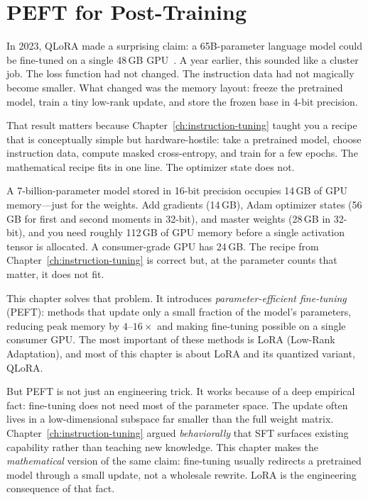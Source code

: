 \chapter{PEFT for Post-Training}
\label{ch:peft}
\raggedbottom

In 2023, QLoRA made a surprising claim: a 65B-parameter language model could be fine-tuned on a single 48\,GB GPU~\cite{dettmers2023qlora}. A year earlier, this sounded like a cluster job. The loss function had not changed. The instruction data had not magically become smaller. What changed was the memory layout: freeze the pretrained model, train a tiny low-rank update, and store the frozen base in 4-bit precision.

That result matters because Chapter~\ref{ch:instruction-tuning} taught you a recipe that is conceptually simple but hardware-hostile: take a pretrained model, choose instruction data, compute masked cross-entropy, and train for a few epochs. The mathematical recipe fits in one line. The optimizer state does not.

A 7-billion-parameter model stored in 16-bit precision occupies 14\,GB of GPU memory---just for the weights. Add gradients (14\,GB), Adam optimizer states (56\,GB for first and second moments in 32-bit), and master weights (28\,GB in 32-bit), and you need roughly 112\,GB of GPU memory before a single activation tensor is allocated. A consumer-grade GPU has 24\,GB. The recipe from Chapter~\ref{ch:instruction-tuning} is correct but, at the parameter counts that matter, it does not fit.

This chapter solves that problem. It introduces \emph{parameter-efficient fine-tuning} (PEFT): methods that update only a small fraction of the model's parameters, reducing peak memory by $4$--$16\times$ and making fine-tuning possible on a single consumer GPU. The most important of these methods is LoRA (Low-Rank Adaptation), and most of this chapter is about LoRA and its quantized variant, QLoRA.

But PEFT is not just an engineering trick. It works because of a deep empirical fact: fine-tuning does not need most of the parameter space. The update often lives in a low-dimensional subspace far smaller than the full weight matrix. Chapter~\ref{ch:instruction-tuning} argued \emph{behaviorally} that SFT surfaces existing capability rather than teaching new knowledge. This chapter makes the \emph{mathematical} version of the same claim: fine-tuning usually redirects a pretrained model through a small update, not a wholesale rewrite. LoRA is the engineering consequence of that fact.

